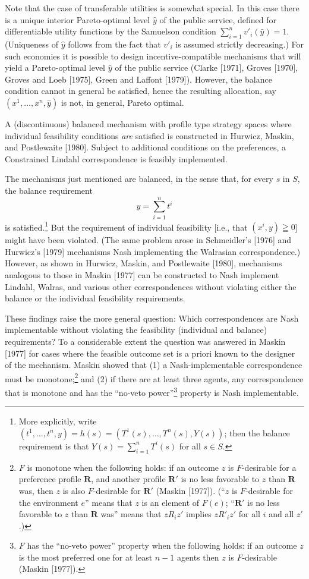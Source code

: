 \documentclass[12pt, letterpaper]{article}
\begin{document}
Note that the case of transferable utilities is somewhat special. In this case there is a unique interior Pareto-optimal level $\hat{y}$ of the public service, defined for differentiable utility functions by the Samuelson condition $\sum_{i=1}^n v'_i(\hat{y}) = 1$. (Uniqueness of $\hat{y}$ follows from the fact that $v'_i$ is assumed strictly decreasing.) For such economies it is possible to design incentive-compatible mechanisms that will yield a Pareto-optimal level $\hat{y}$ of the public service (Clarke [1971], Groves [1970], Groves and Loeb [1975], Green and Laffont [1979]). However, the balance condition cannot in general be satisfied, hence the resulting allocation, say $(x^1, \dots, x^n, \hat{y})$ is not, in general, Pareto optimal.

A (discontinuous) balanced mechanism with profile type strategy spaces where individual feasibility conditions \textit{are} satisfied is constructed in Hurwicz, Maskin, and Postlewaite [1980]. Subject to additional conditions on the preferences, a Constrained Lindahl correspondence is feasibly implemented.

The mechanisms just mentioned are balanced, in the sense that, for every $s$ in $S$, the balance requirement
\[
y = \sum_{i=1}^{n} t^i
\]
is satisfied.\footnote{More explicitly, write $(t^1, \dots, t^n, y) = h(s) = (T^1(s), \dots, T^n(s), Y(s))$; then the balance requirement is that $Y(s) = \sum_{i=1}^n T^i(s)$ for all $s \in S$.} But the requirement of individual feasibility [i.e., that $(x^i, y) \geqq 0$] might have been violated. (The same problem arose in Schmeidler's [1976] and Hurwicz's [1979] mechanisms Nash implementing the Walrasian correspondence.) However, as shown in Hurwicz, Maskin, and Postlewaite [1980], mechanisms analogous to those in Maskin [1977] can be constructed to Nash implement Lindahl, Walras, and various other correspondences without violating either the balance or the individual feasibility requirements.

These findings raise the more general question: Which correspondences are Nash implementable without violating the feasibility (individual and balance) requirements? To a considerable extent the question was answered in Maskin [1977] for cases where the feasible outcome set is a priori known to the designer of the mechanism. Maskin showed that (1) a Nash-implementable correspondence must be monotone;\footnote{$F$ is monotone when the following holds: if an outcome $z$ is $F$-desirable for a preference profile $\mathbf{R}$, and another profile $\mathbf{R}'$ is no less favorable to $z$ than $\mathbf{R}$ was, then $z$ is also $F$-desirable for $\mathbf{R}'$ (Maskin [1977]). (``$z$ is $F$-desirable for the environment $e$'' means that $z$ is an element of $F(e)$; ``$\mathbf{R}'$ is no less favorable to $z$ than $\mathbf{R}$ was'' means that $z R_i z'$ implies $z R'_i z'$ for all $i$ and all $z'$.)} and (2) if there are at least three agents, any correspondence that is monotone and has the ``no-veto power''\footnote{$F$ has the ``no-veto power'' property when the following holds: if an outcome $z$ is the most preferred one for at least $n - 1$ agents then $z$ is $F$-desirable (Maskin [1977]).} property is Nash implementable.
\end{document}
